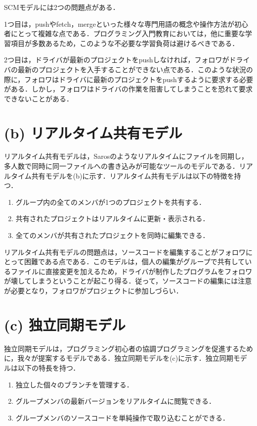 SCMモデルには2つの問題点がある．

1つ目は，pushやfetch，mergeといった様々な専門用語の概念や操作方法が初心者にとって複雑な点である．プログラミング入門教育においては，他に重要な学習項目が多数あるため，このような不必要な学習負荷は避けるべきである．

2つ目は，ドライバが最新のプロジェクトをpushしなければ，フォロワがドライバの最新のプロジェクトを入手することができない点である．このような状況の際に，フォロワはドライバに最新のプロジェクトをpushするように要求する必要がある．しかし，フォロワはドライバの作業を阻害してしまうことを恐れて要求できないことがある．


\section{(b) リアルタイム共有モデル}

リアルタイム共有モデルは，Sarosのようなリアルタイムにファイルを同期し，多人数で同時に同一ファイルへの書き込みが可能なツールのモデルである．リアルタイム共有モデルを(b)に示す．リアルタイム共有モデルは以下の特徴を持つ．

\begin{enumerate}
	\item グループ内の全てのメンバが1つのプロジェクトを共有する．
	\item 共有されたプロジェクトはリアルタイムに更新・表示される．
	\item 全てのメンバが共有されたプロジェクトを同時に編集できる．
\end{enumerate}

リアルタイム共有モデルの問題点は，ソースコードを編集することがフォロワにとって困難である点である．このモデルは，個人の編集がグループで共有しているファイルに直接変更を加えるため，ドライバが制作したプログラムをフォロワが壊してしまうということが起こり得る．従って，ソースコードの編集には注意が必要となり，フォロワがプロジェクトに参加しづらい．


\section{(c) 独立同期モデル}

独立同期モデルは，プログラミング初心者の協調プログラミングを促進するために，我々が提案するモデルである．独立同期モデルを(c)に示す．独立同期モデルは以下の特長を持つ．

\begin{enumerate}
	\item 独立した個々のブランチを管理する．
	\item グループメンバの最新バージョンをリアルタイムに閲覧できる．
	\item グループメンバのソースコードを単純操作で取り込むことができる．
\end{enumerate}

